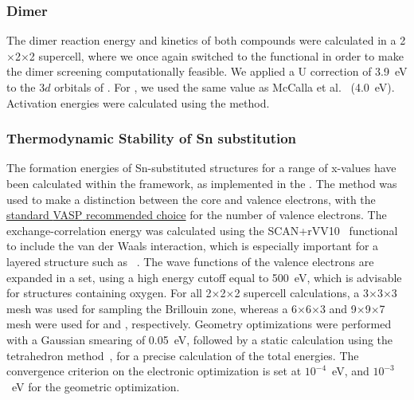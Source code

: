 \begin{refsection}
 \label{appendix:sec-dimer} 
\subsubsection{Dimer} 

The dimer reaction energy and kinetics of both compounds were calculated in a 
2$\times$2$\times$2 supercell, where we once again switched to the  
functional in order to make the dimer screening computationally feasible. 
We applied a U correction of 3.9~\si{\electronvolt} to the 3$d$ orbitals of 
. For , we used the same value as McCalla et al.~\cite{McCalla2015} 
(4.0~\si{\electronvolt}). Activation energies were calculated using the 
 method. 

 \label{appendix:sec-sn_stability}
\subsubsection{Thermodynamic Stability of Sn substitution}  

The formation energies of Sn-substituted structures for a range of x-values have been calculated within the  framework, as implemented in the . The  method was used to make a distinction between the core and valence electrons, with the \href{https://cms.mpi.univie.ac.at/vasp/vasp/Recommended_PAW_potentials_DFT_calculations_using_vasp_5_2.html}{standard \gls{VASP} recommended choice} for the number of valence electrons. The exchange-correlation energy was calculated using the \gls{SCAN}+rVV10~\cite{Sun2015, Peng2016} functional to include the van der Waals interaction, which is especially important for a layered structure such as ~\cite{Govaerts2013}. The wave functions of the valence electrons are expanded in a  set, using a high energy cutoff equal to 500~\si{\electronvolt}, which is advisable for structures containing oxygen. For all 2$\times$2$\times$2 supercell calculations, a 3$\times$3$\times$3  mesh was used for sampling the Brillouin zone, whereas a 6$\times$6$\times$3 and 9$\times$9$\times$7 mesh were used for  and , respectively. Geometry optimizations were performed with a Gaussian smearing of 0.05~\si{\electronvolt}, followed by a static calculation using the tetrahedron method~\cite{Blochl1994a}, for a precise calculation of the total energies. The convergence criterion on the electronic optimization is set at $10^{-4}$~\si{\electronvolt}, and $10^{-3}$~\si{\electronvolt} for the geometric optimization. 


\end{refsection}
